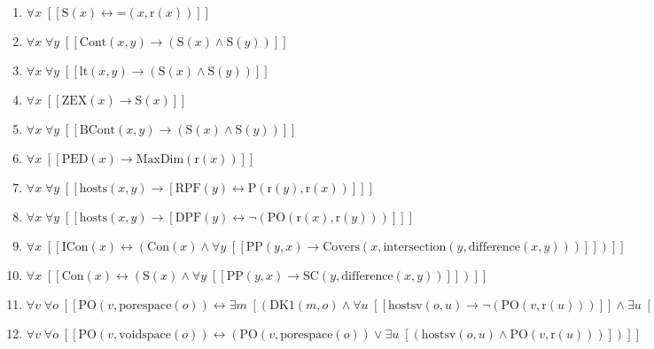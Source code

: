 \documentclass{article}
\begin{document}
\begin{enumerate}
\item $\forall x\;  \left[ \left[ \textrm{S}(x) \leftrightarrow \textrm{=}(x,\textrm{r}(x)) \right] \right]$
\item $\forall x\; \forall y\;  \left[ \left[ \textrm{Cont}(x,y) \rightarrow \left(\textrm{S}(x) \land \textrm{S}(y)\right) \right] \right]$
\item $\forall x\; \forall y\;  \left[ \left[ \textrm{lt}(x,y) \rightarrow \left(\textrm{S}(x) \land \textrm{S}(y)\right) \right] \right]$
\item $\forall x\;  \left[ \left[ \textrm{ZEX}(x) \rightarrow \textrm{S}(x) \right] \right]$
\item $\forall x\; \forall y\;  \left[ \left[ \textrm{BCont}(x,y) \rightarrow \left(\textrm{S}(x) \land \textrm{S}(y)\right) \right] \right]$
\item $\forall x\;  \left[ \left[ \textrm{PED}(x) \rightarrow \textrm{MaxDim}(\textrm{r}(x)) \right] \right]$
\item $\forall x\; \forall y\;  \left[ \left[ \textrm{hosts}(x,y) \rightarrow \left[ \textrm{RPF}(y) \leftrightarrow \textrm{P}(\textrm{r}(y),\textrm{r}(x)) \right] \right] \right]$
\item $\forall x\; \forall y\;  \left[ \left[ \textrm{hosts}(x,y) \rightarrow \left[ \textrm{DPF}(y) \leftrightarrow \neg \left(\textrm{PO}(\textrm{r}(x),\textrm{r}(y))\right) \right] \right] \right]$
\item $\forall x\;  \left[ \left[ \textrm{ICon}(x) \leftrightarrow \left(\textrm{Con}(x) \land \forall y\;  \left[ \left[ \textrm{PP}(y,x) \rightarrow \textrm{Covers}(x,\textrm{intersection}(y,\textrm{difference}(x,y))) \right] \right]\right) \right] \right]$
\item $\forall x\;  \left[ \left[ \textrm{Con}(x) \leftrightarrow \left(\textrm{S}(x) \land \forall y\;  \left[ \left[ \textrm{PP}(y,x) \rightarrow \textrm{SC}(y,\textrm{difference}(x,y)) \right] \right]\right) \right] \right]$
\item $\forall v\; \forall o\;  \left[ \left[ \textrm{PO}(v,\textrm{porespace}(o)) \leftrightarrow \exists m\;  \left[ \left(\textrm{DK1}(m,o) \land \forall u\;  \left[ \left[ \textrm{hostsv}(o,u) \rightarrow \neg \left(\textrm{PO}(v,\textrm{r}(u))\right) \right] \right] \land \exists u\;  \left[ \left(\textrm{hostsv}(m,u) \land \textrm{PO}(v,\textrm{r}(u))\right) \right]\right) \right] \right] \right]$
\item $\forall v\; \forall o\;  \left[ \left[ \textrm{PO}(v,\textrm{voidspace}(o)) \leftrightarrow \left(\textrm{PO}(v,\textrm{porespace}(o)) \lor \exists u\;  \left[ \left(\textrm{hostsv}(o,u) \land \textrm{PO}(v,\textrm{r}(u))\right) \right]\right) \right] \right]$

\end{enumerate}
\end{document}
